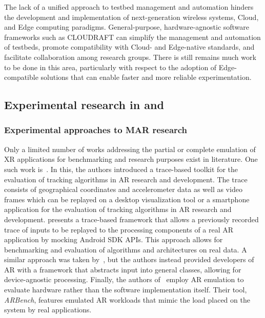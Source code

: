 The lack of a unified approach to testbed management and automation hinders the development and implementation of next-generation wireless systems, Cloud, and Edge computing paradigms.
General-purpose, hardware-agnostic software frameworks such as \gls{CLOUDRAFT} can simplify the management and automation of testbeds, promote compatibility with Cloud- and Edge-native standards, and facilitate collaboration among research groups.
There is still remains much work to be done in this area, particularly with respect to the adoption of Edge-compatible solutions that can enable faster and more reliable experimentation.

\subsection{Experimental research in  and }



\subsubsection{Experimental approaches to \gls{MAR} research}\label{sec:relwork:xremulation}

Only a limited number of works addressing the partial or complete emulation of XR applications for benchmarking and research purposes exist in literature.
One such work is~\cite{williams2013transform}.
In this, the authors introduced a trace-based toolkit for the evaluation of tracking algorithms in \gls{AR} research and development.
The trace consists of geographical coordinates and accelerometer data as well as video frames which can be replayed on a desktop visualization tool or a smartphone application for the evaluation of tracking algorithms in \gls{AR} research and development.\@
\cite{munro2016aaremu} presents a trace-based framework that allows a previously recorded trace of inputs to be replayed to the processing components of a real \gls{AR} application by mocking Android \gls{SDK} \glspl{API}.
This approach allows for benchmarking and evaluation of algorithms and architectures on real data.
A similar approach was taken by~\cite{choi2022emulating}, but the authors instead provided developers of \gls{AR} with a framework that abstracts input into general classes, allowing for device-agnostic processing.
Finally, the authors of~\cite{chetoui2022arbench} employ \gls{AR} emulation to evaluate hardware rather than the software implementation itself.
Their tool, \emph{ARBench}, features emulated \gls{AR} workloads that mimic the load placed on the system by real applications.

